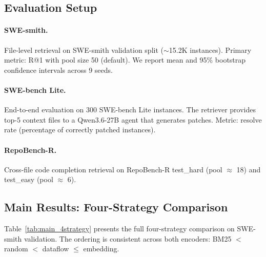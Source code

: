 \documentclass[11pt]{article}
\begin{document}
\subsection{Evaluation Setup}

\paragraph{SWE-smith.}
File-level retrieval on SWE-smith validation split ($\sim$15.2K instances).
Primary metric: R@1 with pool size 50 (default).
We report mean and 95\% bootstrap confidence intervals across 9 seeds.

\paragraph{SWE-bench Lite.}
End-to-end evaluation on 300 SWE-bench Lite instances.
The retriever provides top-5 context files to a Qwen3.6-27B agent that generates patches.
Metric: resolve rate (percentage of correctly patched instances).

\paragraph{RepoBench-R.}
Cross-file code completion retrieval on RepoBench-R test\_hard (pool $\approx$ 18) and test\_easy (pool $\approx$ 6).

\subsection{Main Results: Four-Strategy Comparison}
\label{sec:main_results}

Table~\ref{tab:main_4strategy} presents the full four-strategy comparison on SWE-smith validation.
The ordering is consistent across both encoders: BM25 $<$ random $<$ dataflow $\leq$ embedding.
\end{document}
